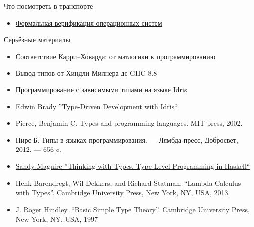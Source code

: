 
    \begin{frame}{Что посмотреть в транспорте}
        \begin{itemize}
            \item \href{https://youtu.be/f12hIDF0XPc}{\color{blue} Формальная верификация операционных систем}
        \end{itemize}
    \end{frame}

    \begin{frame}{Серьёзные материалы}
        \begin{itemize}
            \item \href{https://www.mccme.ru/dubna/2017/courses/bragilevsky.html}{\color{blue} Соответствие Карри–Ховарда: от матлогики к программированию}
            \item \href{https://www.youtube.com/watch?v=_HYI7zjkrEs&list=PLvPsfYrGz3wuVAGhNf6-i7uafXg56oqM5}{\color{blue} Вывод типов от Хиндли-Милнера до GHC 8.8}
            \item \href{https://youtu.be/o-7zhrUP3ds}{\color{blue} Программирование с зависимыми типами на языке Idris}
            \item \href{https://www.amazon.com/Type-driven-Development-Idris-Edwin-Brady/dp/1617293024}{\color{blue} Edwin Brady ''Type-Driven Development with Idris``}
            \item Pierce, Benjamin C. Types and programming languages. MIT press, 2002.
            \item Пирс Б. Типы в языках программирования. — Лямбда пресс, Добросвет, 2012. — 656 c.
            \item \href{https://thinkingwithtypes.com/}{\color{blue} Sandy Maguire ''Thinking with Types. Type-Level Programming in Haskell``}
            \item Henk Barendregt, Wil Dekkers, and Richard Statman. ``Lambda Calculus with Types''. Cambridge University Press, New York, NY, USA, 2013.
            \item J. Roger Hindley. ``Basic Simple Type Theory''. Cambridge University Press, New York, NY, USA, 1997
        \end{itemize}
    \end{frame}


